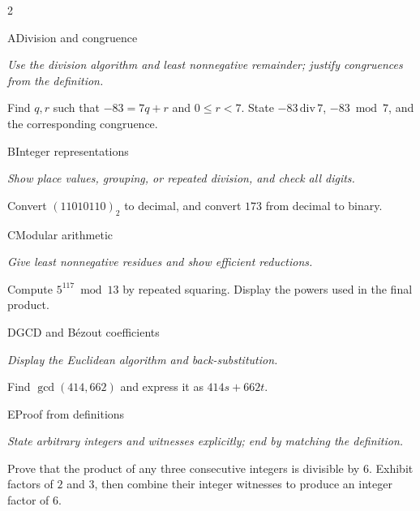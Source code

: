 \documentclass[9pt]{extarticle}
\begin{document}
\begin{multicols}{2}
\begin{CoreProblem}{A}{Division and congruence}
{\scriptsize\textit{Use the division algorithm and least nonnegative remainder; justify congruences from the definition.}\par}
Find $q,r$ such that $-83=7q+r$ and $0\le r<7$. State
$-83\,\mathrm{div}\,7$, $-83\bmod7$, and the corresponding congruence.
\end{CoreProblem}
\begin{CoreProblem}{B}{Integer representations}
{\scriptsize\textit{Show place values, grouping, or repeated division, and check all digits.}\par}
Convert $(11010110)_2$ to decimal, and convert $173$ from decimal to binary.
\end{CoreProblem}
\begin{CoreProblem}{C}{Modular arithmetic}
{\scriptsize\textit{Give least nonnegative residues and show efficient reductions.}\par}
Compute $5^{117}\bmod13$ by repeated squaring. Display the powers used in the
final product.
\end{CoreProblem}
\columnbreak
\begin{CoreProblem}{D}{GCD and B\'ezout coefficients}
{\scriptsize\textit{Display the Euclidean algorithm and back-substitution.}\par}
Find $\gcd(414,662)$ and express it as $414s+662t$.
\end{CoreProblem}
\begin{CoreProblem}{E}{Proof from definitions}
{\scriptsize\textit{State arbitrary integers and witnesses explicitly; end by matching the definition.}\par}
Prove that the product of any three consecutive integers is divisible by $6$.
Exhibit factors of $2$ and $3$, then combine their integer witnesses to
produce an integer factor of $6$.
\end{CoreProblem}
\end{multicols}
\CoreWorkArea
\FormBreak
{}
\end{document}
